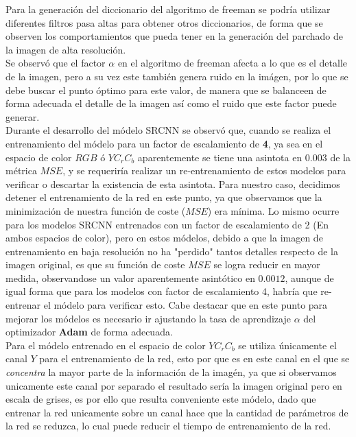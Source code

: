 \noindent
Para la generación del diccionario del algoritmo de freeman se podría utilizar diferentes filtros pasa altas para obtener otros
diccionarios, de forma que se observen los comportamientos que pueda tener en la generación del parchado de la imagen de
alta resolución.\\
Se observó que el factor $\alpha$ en el algoritmo de freeman afecta a lo que es el detalle de la imagen, pero a su vez este también genera ruido en la imágen,
por lo que se debe buscar el punto óptimo para este valor, de manera que se balanceen de forma adecuada el detalle de la imagen
así como el ruido que este factor puede generar.\\
Durante el desarrollo del módelo SRCNN se observó que, cuando se realiza el entrenamiento del módelo para un factor de escalamiento
de \textbf{4}, ya sea en el espacio de color $RGB$ ó $YC_rC_b$ aparentemente se tiene una asintota en $0.003$ de la métrica $MSE$,
y se requeriría realizar un re-entrenamiento de estos modelos para verificar o descartar la existencia de esta asintota. Para
nuestro caso, decidimos detener el entrenamiento de la red en este punto, ya que observamos que la minimización de nuestra función
de coste ($MSE$) era mínima. Lo mismo ocurre para los modelos SRCNN entrenados con un factor de escalamiento de 2 (En ambos
espacios de color), pero en estos módelos, debido a que la imagen de entrenamiento en baja resolución no ha "perdido" tantos
detalles respecto de la imagen original, es que su función de coste $MSE$ se logra reducir en mayor medida, observandose un valor
aparentemente asintótico en $0.0012$, aunque de igual forma que para los modelos con factor de escalamiento 4, habría que re-entrenar
el módelo para verificar esto. Cabe destacar que en este punto para mejorar los módelos es necesario ir ajustando la tasa de aprendizaje
$\alpha$ del optimizador \textbf{Adam} de forma adecuada.\\
Para el módelo entrenado en el espacio de color $YC_rC_b$ se utiliza únicamente el canal $Y$ para el entrenamiento de la red,
esto por que es en este canal en el que se \emph{concentra} la mayor parte de la información de la imagén, ya que si observamos
unicamente este canal por separado el resultado sería la imagen original pero en escala de grises, es por ello que resulta conveniente
este módelo, dado que entrenar la red unicamente sobre un canal hace que la cantidad de parámetros de la red se reduzca, lo cual
puede reducir el tiempo de entrenamiento de la red.